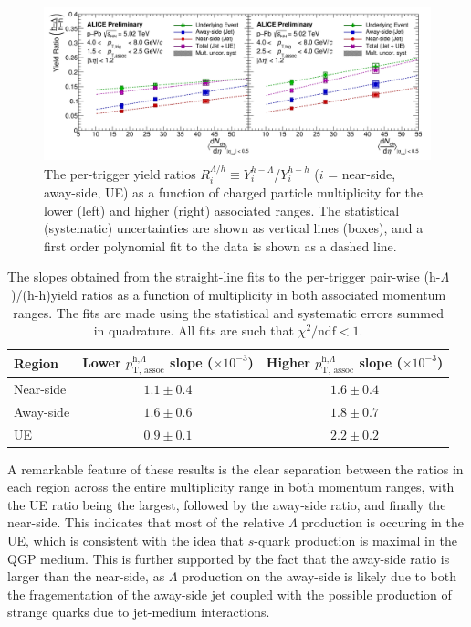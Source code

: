 \begin{figure}[h!]
\centering
\includegraphics[width=\textwidth]{figures/results/ratio_plot_dndeta.png}
\caption{The per-trigger yield ratios $R_{i}^{\Lambda/h} \equiv Y_{i}^{h-\Lambda}$/$Y_{i}^{h-h}$ ($i$ = near-side, away-side, UE) as a function of charged particle multiplicity for the lower (left) and higher (right) associated \pt ranges. The statistical (systematic) uncertainties are shown as vertical lines (boxes), and a first order polynomial fit to the data is shown as a dashed line.}
\label{fig:lambda_hadron_ratio}
\end{figure}

\begin{table}
\centering
\caption{The slopes obtained from the straight-line fits to the per-trigger pair-wise (h-$\Lambda$)/(h-h)yield ratios as a function of multiplicity in both associated momentum ranges. The fits are made using the statistical and systematic errors summed in quadrature. All fits are such that $\chi^{2}/\text{ndf} < 1$.}
\begin{tabular}{l c c}
\hline
Region & Lower $p_{\text{T, assoc}}^{\text{h,}\Lambda}$ slope ($\times10^{-3}$) & Higher $p_{\text{T, assoc}}^{\text{h,}\Lambda}$  slope ($\times10^{-3}$) \\
\hline
Near-side & $1.1 \pm 0.4$ & $1.6 \pm 0.4$ \\
Away-side & $1.6 \pm 0.6$ & $1.8 \pm 0.7$ \\
UE & $0.9 \pm 0.1$ & $2.2 \pm 0.2$ \\
\hline
\end{tabular}
\label{tab:lambda_hadron_slopes}
\end{table}

\clearpage

A remarkable feature of these results is the clear separation between the ratios in each region across the entire multiplicity range in both momentum ranges, with the UE ratio being the largest, followed by the away-side ratio, and finally the near-side. This indicates that most of the relative $\Lambda$ production is occuring in the UE, which is consistent with the idea that $s$-quark production is maximal in the QGP medium. This is further supported by the fact that the away-side ratio is larger than the near-side, as $\Lambda$ production on the away-side is likely due to both the fragementation of the away-side jet coupled with the possible production of strange quarks due to jet-medium interactions. 


